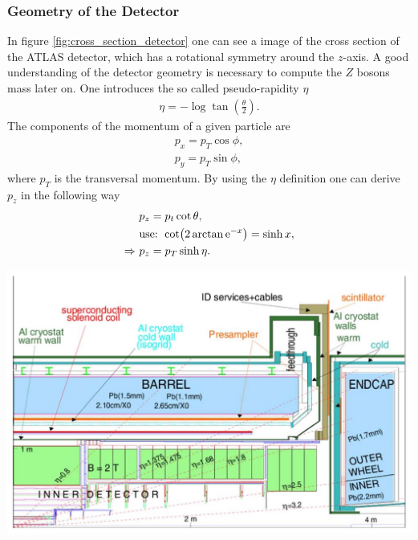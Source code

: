 \documentclass[12pt, a4paper, bibliography=totoc]{scrartcl}
\begin{document}
\begin{multicols}{2}
\subsubsection{Geometry of the Detector}
In figure \ref{fig:cross_section_detector} one can see a image of the cross section of the ATLAS detector, which has a rotational symmetry around the $z$-axis.
A good understanding of the detector geometry is necessary to compute the $Z$ bosons mass later on. 
One introduces the so called pseudo-rapidity $\eta$
\begin{align}
    \eta = - \log \tan \left( \frac{\theta}{2} \right).
\end{align}
The components of the momentum of a given particle are
\begin{align}
    p_x = p_T \cos \phi , \\
    p_y = p_T \sin \phi ,
\end{align}
where $p_T$ is the transversal momentum.
By using the $\eta$ definition one can derive $p_z$ in the following way
\begin{align}
    & p_z = p_t \cot \theta , \\
    & \text{use: } \cot (2\arctan \mathrm{e}^{-x}) = \sinh x , \\
    \Rightarrow \ & p_z = p_T \sinh \eta .
\end{align}
\begin{center}
\includegraphics[width=0.8\linewidth]{fig/detector_geometry.png}
\label{fig:cross_section_detector}
\end{center}


\end{multicols}
\end{document}
